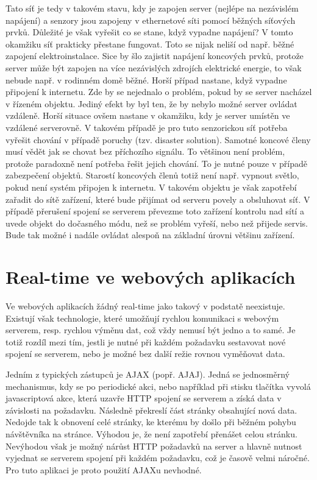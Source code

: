 Tato síť je tedy v takovém stavu, kdy je zapojen server (nejlépe na nezávislém napájení) a senzory jsou zapojeny v ethernetové síti pomocí běž\-ných síťových prvků. Důležité je však vyřešit co se stane, když vypadne napájení? V tomto okamžiku síť prakticky přestane fungovat. Toto se nijak neliší od např. běžné zapojení elektroinstalace. Sice by šlo zajistit napájení koncových prvků, protože server může být zapojen na více nezávislých zdro\-jích elektrické energie, to však nebude např. v rodinném domě běžné. Horší případ nastane, když vypadne připojení k internetu. Zde by se nejednalo o problém, pokud by se server nacházel v řízeném objektu. Jediný efekt by byl ten, že by nebylo možné server ovládat vzdáleně. Horší situace ovšem nastane v okamžiku, kdy je server umístěn ve vzdálené serverovně. V takovém případě je pro tuto senzorickou síť potřeba vyřešit chování v případě poruchy (tzv. disaster solution). Samotné koncové členy musí vědět jak se chovat bez příchozího signálu. To většinou není problém, protože paradoxně není potřeba řešit jejich chování. To je nutné pouze v případě zabezpečení objektů. Starostí koncových členů totiž není např. vypnout světlo, pokud není systém připojen k internetu. V takovém objektu je však zapotřebí zařadit do sítě zařízení, které bude přijímat od serveru povely a obsluhovat síť. V případě přerušení spojení se serverem převezme toto zařízení kontrolu nad sítí a uvede objekt do dočasného módu, než se problém vyřeší, nebo než přijede servis. Bude tak možné i nadále ovládat alespoň na základní úrovni většinu zařízení.

\section{Real-time ve webových aplikacích}
Ve webových aplikacích žádný real-time jako takový v podstatě neexistuje. Existují však technologie, které umožňují rychlou komunikaci s webovým serverem, resp. rychlou výměnu dat, což vždy nemusí být jedno a to samé. Je totiž rozdíl mezi tím, jestli je nutné při každém požadavku sestavovat nové spojení se serverem, nebo je možné bez další režie rovnou vyměňovat data.

Jedním z typických zástupců je AJAX (popř. AJAJ). Jedná se jed\-no\-směr\-ný mechanismus, kdy se po periodické akci, nebo například při stisku tlačítka vyvolá javascriptová akce, která uzavře HTTP spojení se serverem a získá data v závislosti na požadavku. Následně překreslí část stránky obsahující nová data. Nedojde tak k obnovení celé stránky, ke kterému by došlo při běžném pohybu návštěvníka na stránce. Výhodou je, že není zapotřebí přenášet celou stránku. Nevýhodou však je možný nárůst HTTP požadavků na server a hlavně nutnost vyjednat se serverem spojení při každém po\-ža\-dav\-ku, což je časově velmi náročné. Pro tuto aplikaci je proto použití AJAXu nevhodné.


